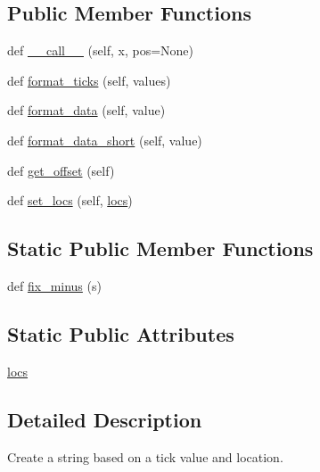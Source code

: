 \subsection*{Public Member Functions}
\begin{DoxyCompactItemize}
\item 
def \hyperlink{classmatplotlib_1_1ticker_1_1Formatter_a996e93d5f061bf0cf216633f48ca60ed}{\+\_\+\+\_\+call\+\_\+\+\_\+} (self, x, pos=None)
\item 
def \hyperlink{classmatplotlib_1_1ticker_1_1Formatter_aa5199a3212bebba98fb2d0f3bea28cbd}{format\+\_\+ticks} (self, values)
\item 
def \hyperlink{classmatplotlib_1_1ticker_1_1Formatter_a5a8ff9f1b254c8fc48aa6b2296394f0c}{format\+\_\+data} (self, value)
\item 
def \hyperlink{classmatplotlib_1_1ticker_1_1Formatter_a7f685100c7b0f7368c4831b07138ed64}{format\+\_\+data\+\_\+short} (self, value)
\item 
def \hyperlink{classmatplotlib_1_1ticker_1_1Formatter_ae1bd002ed45163d8c0391047a1bcb03f}{get\+\_\+offset} (self)
\item 
def \hyperlink{classmatplotlib_1_1ticker_1_1Formatter_afb2f2269dfe90e58ff5bff67a598b496}{set\+\_\+locs} (self, \hyperlink{classmatplotlib_1_1ticker_1_1Formatter_a2b5924640e2c85567e80f40931f7bbf8}{locs})
\end{DoxyCompactItemize}
\subsection*{Static Public Member Functions}
\begin{DoxyCompactItemize}
\item 
def \hyperlink{classmatplotlib_1_1ticker_1_1Formatter_a88b831b98e4a91369979be4d11095073}{fix\+\_\+minus} (s)
\end{DoxyCompactItemize}
\subsection*{Static Public Attributes}
\begin{DoxyCompactItemize}
\item 
\hyperlink{classmatplotlib_1_1ticker_1_1Formatter_a2b5924640e2c85567e80f40931f7bbf8}{locs}
\end{DoxyCompactItemize}


\subsection{Detailed Description}
\begin{DoxyVerb}Create a string based on a tick value and location.
\end{DoxyVerb}
 

